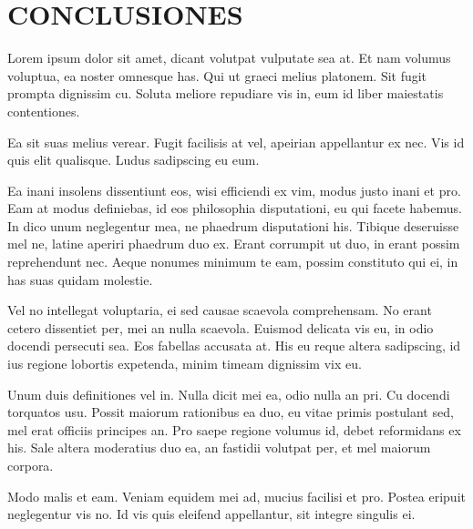 \chapter*{\Large CONCLUSIONES} 

Lorem ipsum dolor sit amet, dicant volutpat vulputate sea at. Et nam volumus voluptua, ea noster omnesque has. Qui ut graeci melius platonem. Sit fugit prompta dignissim cu. Soluta meliore repudiare vis in, eum id liber maiestatis contentiones.

Ea sit suas melius verear. Fugit facilisis at vel, apeirian appellantur ex nec. Vis id quis elit qualisque. Ludus sadipscing eu eum.

Ea inani insolens dissentiunt eos, wisi efficiendi ex vim, modus justo inani et pro. Eam at modus definiebas, id eos philosophia disputationi, eu qui facete habemus. In dico unum neglegentur mea, ne phaedrum disputationi his. Tibique deseruisse mel ne, latine aperiri phaedrum duo ex. Erant corrumpit ut duo, in erant possim reprehendunt nec. Aeque nonumes minimum te eam, possim constituto qui ei, in has suas quidam molestie.

Vel no intellegat voluptaria, ei sed causae scaevola comprehensam. No erant cetero dissentiet per, mei an nulla scaevola. Euismod delicata vis eu, in odio docendi persecuti sea. Eos fabellas accusata at. His eu reque altera sadipscing, id ius regione lobortis expetenda, minim timeam dignissim vix eu.

Unum duis definitiones vel in. Nulla dicit mei ea, odio nulla an pri. Cu docendi torquatos usu. Possit maiorum rationibus ea duo, eu vitae primis postulant sed, mel erat officiis principes an. Pro saepe regione volumus id, debet reformidans ex his. Sale altera moderatius duo ea, an fastidii volutpat per, et mel maiorum corpora.

Modo malis et eam. Veniam equidem mei ad, mucius facilisi et pro. Postea eripuit neglegentur vis no. Id vis quis eleifend appellantur, sit integre singulis ei.
